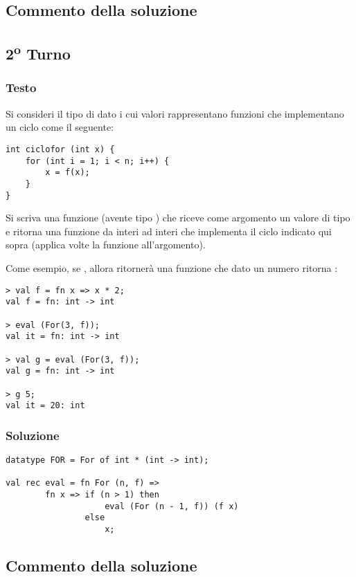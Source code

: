 \subsection{Commento della soluzione}

\omissis


\subsection{2\textsuperscript{o} Turno}

\subsubsection{Testo}

Si consideri il tipo di dato  i cui valori  rappresentano funzioni che implementano un ciclo  come il seguente:

\begin{lstlisting}[style = SML, caption = {Esempio di ciclo for in \sml{C}}]
int ciclofor (int x) {
	for (int i = 1; i < n; i++) {
		x = f(x);
	}
}
\end{lstlisting}

Si scriva una funzione  (avente tipo ) che riceve come argomento un valore di tipo  e ritorna una funzione da interi ad interi che implementa il ciclo indicato qui sopra (applica  volte la funzione  all'argomento).

\medskip
Come esempio, se , allora  ritornerà una funzione che dato un numero  ritorna :

\begin{lstlisting}[style = SML]
> val f = fn x => x * 2;
val f = fn: int -> int

> eval (For(3, f));
val it = fn: int -> int

> val g = eval (For(3, f));
val g = fn: int -> int

> g 5;
val it = 20: int
\end{lstlisting}

\subsubsection{Soluzione}

\begin{lstlisting}[style = SML, caption = {definizione della funzione \sml{eval}}]
datatype FOR = For of int * (int -> int);

val rec eval = fn For (n, f) =>
		fn x => if (n > 1) then
					eval (For (n - 1, f)) (f x)
				else
					x;
\end{lstlisting}

\subsection{Commento della soluzione}

\omissis
